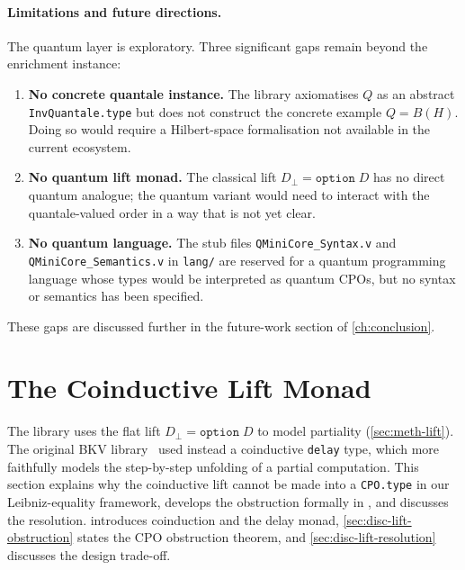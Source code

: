 \paragraph{Limitations and future directions.}
The quantum layer is exploratory.
Three significant gaps remain beyond the enrichment instance:
\begin{enumerate}
  \item \textbf{No concrete quantale instance.}
    The library axiomatises $Q$ as an abstract
    \texttt{InvQuantale.type} but does not construct the concrete
    example $Q = B(H)$.
    Doing so would require a Hilbert-space formalisation not available
    in the current \Rocq{} ecosystem.

  \item \textbf{No quantum lift monad.}
    The classical lift $D_\bot = \texttt{option}\;D$ has no direct
    quantum analogue; the quantum variant would need to interact with
    the quantale-valued order in a way that is not yet clear.

  \item \textbf{No quantum language.}
    The stub files \texttt{QMiniCore\_Syntax.v} and
    \texttt{QMiniCore\_Semantics.v} in \texttt{lang/} are reserved
    for a quantum programming language whose types would be
    interpreted as quantum CPOs, but no syntax or semantics has been
    specified.
\end{enumerate}
These gaps are discussed further in the future-work section of
\cref{ch:conclusion}.

\section{The Coinductive Lift Monad}
\label{sec:disc-lift-monad}


The library uses the flat lift $D_\bot = \texttt{option}\;D$ to model
partiality (\cref{sec:meth-lift}).
The original BKV library~\cite{BKV2009} used instead a coinductive
\texttt{delay} type, which more faithfully models the step-by-step
unfolding of a partial computation.
This section explains why the coinductive lift cannot be made into a
\texttt{CPO.type} in our Leibniz-equality framework, develops the
obstruction formally in \Rocq{}, and discusses the resolution.
 introduces coinduction and the delay monad,
\cref{sec:disc-lift-obstruction} states the CPO obstruction theorem,
and \cref{sec:disc-lift-resolution} discusses the design trade-off.

